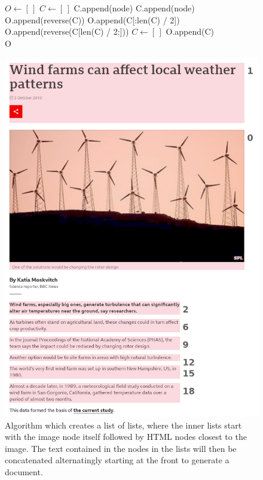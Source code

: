 \documentclass[
]{ceurart}
\begin{document}
\begin{figure}[htbp]
	\begin{minipage}[b]{.45\textwidth}
\begin{algorithmic}
	\State $O \gets [\,]$
	\State $C \gets [\,]$
			\State C.append(node)
		\EndIf
			\State C.append(node)
				\State O.append(reverse(C))
			\Else
				\State O.append(C[:len(C) / 2])
				\State O.append(reverse(C[len(C) / 2:]))
			\EndIf
			\State $C \gets [\,]$
		\EndIf
	\EndFor
\State O.append(C) \\
\Return O
\end{algorithmic}
\end{minipage}
\hfill
\begin{minipage}[b]{.41\textwidth}
	\includegraphics[width=\textwidth]{figures/bbc-news-1.png}
\end{minipage}
\vspace{.5em}
\caption{Algorithm which creates a list of lists, where the inner lists start with the image node itself followed by HTML nodes closest to the image. The text contained in the nodes in the lists will then be concatenated alternatingly starting at the front to generate a document.}
\end{figure}
\end{document}
